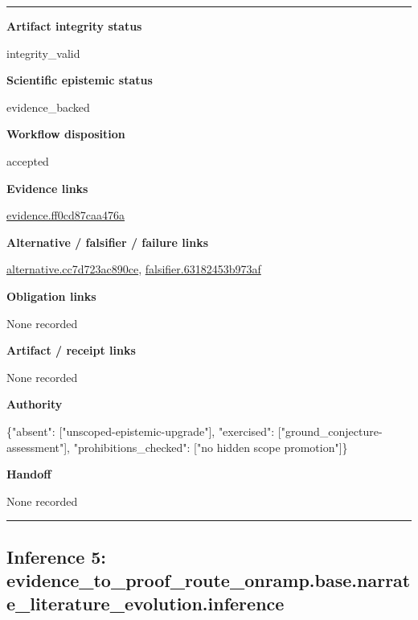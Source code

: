 \documentclass[10pt,a4paper]{article}
\newcommand{\TraceField}[2]{\par\noindent\textbf{#1}\par\noindent #2\par\smallskip}
\newenvironment{TraceDossier}{\par\medskip\noindent\hrule\medskip}{\medskip\hrule\par\medskip}
\begin{document}
\begin{TraceDossier}
\TraceField{Artifact integrity status}{integrity\_\allowbreak{}valid}

\TraceField{Scientific epistemic status}{evidence\_\allowbreak{}backed}

\TraceField{Workflow disposition}{accepted}

\TraceField{Evidence links}{\hyperlink{trace-evidence-163aa2bd721cbeb849}{evidence.\allowbreak{}ff0cd87caa\allowbreak{}476a}}

\TraceField{Alternative / falsifier / failure links}{\hyperlink{trace-alternative-67423bbab207c3d470}{alternativ\allowbreak{}e.\allowbreak{}cc7d723ac8\allowbreak{}90ce}, \hyperlink{trace-alternative-71e9fe5ac26f21163e}{falsifier.\allowbreak{}63182453b9\allowbreak{}73af}}

\TraceField{Obligation links}{None recorded}

\TraceField{Artifact / receipt links}{None recorded}

\TraceField{Authority}{\{"absent":\allowbreak{} ["unscoped\allowbreak{}-\allowbreak{}epistemic-\allowbreak{}upgrade"],\allowbreak{} "exercised\allowbreak{}":\allowbreak{} ["ground\_\allowbreak{}conjecture\allowbreak{}-\allowbreak{}assessment\allowbreak{}"], "prohibiti\allowbreak{}ons\_\allowbreak{}checked":\allowbreak{} ["no hidden scope promotion"\allowbreak{}]\}}

\TraceField{Handoff}{None recorded}

\end{TraceDossier}
\pagebreak[2]\subsection{Inference 5: evidence\_\allowbreak{}to\_\allowbreak{}proof\_\allowbreak{}route\_\allowbreak{}onramp.\allowbreak{}base.\allowbreak{}narrate\_\allowbreak{}literature\allowbreak{}\_\allowbreak{}evolution.\allowbreak{}inference}\label{trace-inference-daea380b84131e71bb}
\end{document}
